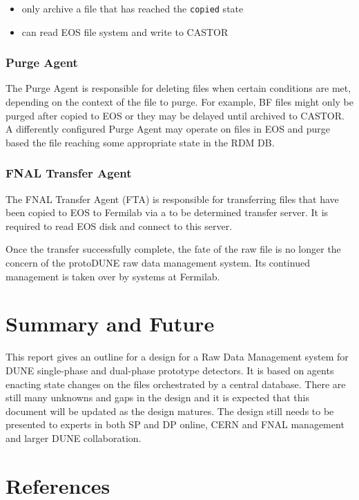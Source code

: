 \documentclass[pdftex,12pt,letter]{article}
\begin{document}
\begin{itemize}
\item only archive a file that has reached the \texttt{copied} state
\item can read EOS file system and write to CASTOR
\end{itemize}

\subsubsection{Purge Agent}

The Purge Agent is responsible for deleting files when certain
conditions are met, depending on the context of the file to purge.
For example, BF files might only be purged after copied to EOS or they
may be delayed until archived to CASTOR.  A differently configured
Purge Agent may operate on files in EOS and purge based the file
reaching some appropriate state in the RDM DB.

\subsubsection{FNAL Transfer Agent}

The FNAL Transfer Agent (FTA) is responsible for transferring files
that have been copied to EOS to Fermilab via a to be determined
transfer server.  It is required to read EOS disk and connect to this
server.  

Once the transfer successfully complete, the fate of the raw file is
no longer the concern of the protoDUNE raw data management system.
Its continued management is taken over by systems at Fermilab.

\section{Summary and Future}

This report gives an outline for a design for a Raw Data Management
system for DUNE single-phase and dual-phase prototype detectors.  It
is based on agents enacting state changes on the files orchestrated by
a central database.  There are still many unknowns and gaps in the
design and it is expected that this document will be updated as the
design matures.  The design still needs to be presented to experts in
both SP and DP online, CERN and FNAL management and larger DUNE
collaboration.


\section{References}

\end{document}
